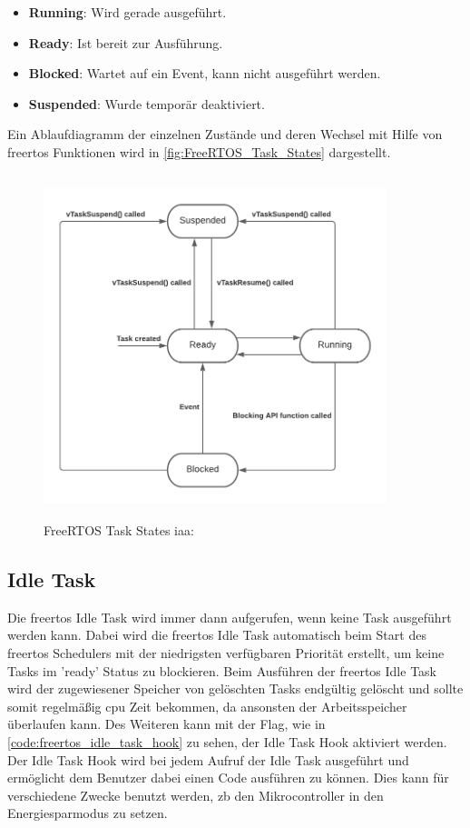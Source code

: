 \documentclass[../EDF Master Thesis.tex]{subfiles}
\begin{document}
\begin{itemize}
    \item \textbf{Running}: Wird gerade ausgeführt.
    \item \textbf{Ready}: Ist bereit zur Ausführung.
    \item \textbf{Blocked}: Wartet auf ein Event, kann nicht ausgeführt werden.
    \item \textbf{Suspended}: Wurde temporär deaktiviert.
\end{itemize}

Ein Ablaufdiagramm der einzelnen Zustände und deren Wechsel mit Hilfe von \ac{freertos} Funktionen wird in \autoref{fig:FreeRTOS_Task_States} dargestellt.

\begin{figure}[H]
    \centering
    \includegraphics[height=10cm, width=10cm]{./attachments/FreeRTOS_Task_States.pdf}
    \caption{FreeRTOS Task States \ac{iaa}: \parencite{freertos-task-states}}
    \label{fig:FreeRTOS_Task_States}
\end{figure}

\subsection{Idle Task} \label{section:idle_task}
Die \ac{freertos} Idle Task wird immer dann aufgerufen, wenn keine Task ausgeführt werden kann.
Dabei wird die \ac{freertos} Idle Task automatisch beim Start des \ac{freertos} Schedulers mit der niedrigsten verfügbaren Priorität erstellt, um keine Tasks im 'ready' Status zu blockieren.
Beim Ausführen der \ac{freertos} Idle Task wird der zugewiesener Speicher von gelöschten Tasks endgültig gelöscht und sollte somit regelmäßig \ac{cpu} Zeit bekommen, da ansonsten der Arbeitsspeicher überlaufen kann.
Des Weiteren kann mit der Flag, wie in \autoref{code:freertos_idle_task_hook} zu sehen, der Idle Task Hook aktiviert werden.
Der Idle Task Hook wird bei jedem Aufruf der Idle Task ausgeführt und ermöglicht dem Benutzer dabei einen Code ausführen zu können.
Dies kann für verschiedene Zwecke benutzt werden, \ac{zb} den Mikrocontroller in den Energiesparmodus zu setzen.
\end{document}
